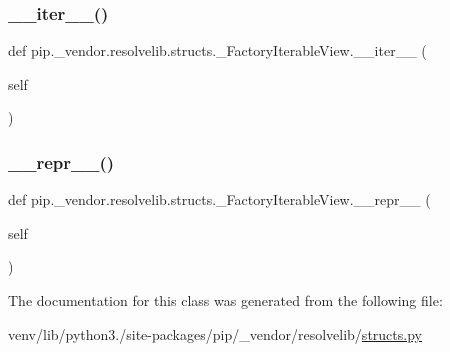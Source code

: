 \subsubsection{\texorpdfstring{\+\_\+\+\_\+iter\+\_\+\+\_\+()}{\_\_iter\_\_()}}
{\footnotesize\ttfamily def pip.\+\_\+vendor.\+resolvelib.\+structs.\+\_\+\+Factory\+Iterable\+View.\+\_\+\+\_\+iter\+\_\+\+\_\+ (\begin{DoxyParamCaption}\item[{}]{self }\end{DoxyParamCaption})}

\mbox{\label{classpip_1_1__vendor_1_1resolvelib_1_1structs_1_1__FactoryIterableView_a7ef459108eef256df6d991bffb859be4}} 
\subsubsection{\texorpdfstring{\+\_\+\+\_\+repr\+\_\+\+\_\+()}{\_\_repr\_\_()}}
{\footnotesize\ttfamily def pip.\+\_\+vendor.\+resolvelib.\+structs.\+\_\+\+Factory\+Iterable\+View.\+\_\+\+\_\+repr\+\_\+\+\_\+ (\begin{DoxyParamCaption}\item[{}]{self }\end{DoxyParamCaption})}



The documentation for this class was generated from the following file\+:\begin{DoxyCompactItemize}
\item 
venv/lib/python3./site-\/packages/pip/\+\_\+vendor/resolvelib/\hyperlink{structs_8py}{structs.\+py}\end{DoxyCompactItemize}
